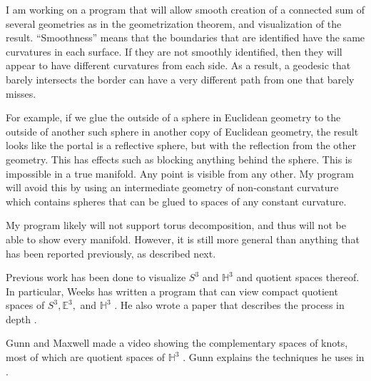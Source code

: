 \documentclass[12pt]{amsart}
\begin{document}

I am working on a program that will allow smooth creation of a connected sum of several geometries as in the geometrization theorem, and visualization of the result. ``Smoothness'' means that the boundaries that are identified have the same curvatures in each surface. If they are not smoothly identified, then they will appear to have different curvatures from each side. As a result, a geodesic that barely intersects the border can have a very different path from one that barely misses.

For example, if we glue the outside of a sphere in Euclidean geometry to the outside of another such sphere in another copy of Euclidean geometry, the result looks like the portal is a reflective sphere, but with the reflection from the other geometry. This has effects such as blocking anything behind the sphere. This is impossible in a true manifold. Any point is visible from any other. My program will avoid this by using an intermediate geometry of non-constant curvature which contains spheres that can be glued to spaces of any constant curvature.

My program likely will not support torus decomposition, and thus will not be able to show every manifold. However, it is still more general than anything that has been reported previously, as described next.






Previous work has been done to visualize $S^3$ and $\mathbb{H}^3$ and quotient spaces thereof. In particular, Weeks has written a program that can view compact quotient spaces of $S^3, \mathbb{E}^3,$ and $\mathbb{H}^3$ \cite{CurvedSpaces}. He also wrote a paper that describes the process in depth \cite{CurvedSpacesPaper}.

Gunn and Maxwell made a video showing the complementary spaces of knots, most of which are quotient spaces of $\mathbb{H}^3$ \cite{NotKnot}. Gunn explains the techniques he uses in \cite{CharlieGunn} \cite{CharlieGunn2}.
\end{document}
